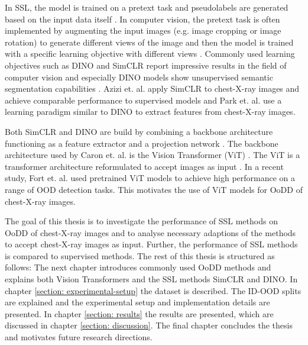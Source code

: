 In SSL, the model is trained on a pretext task and pseudolabels are generated based on the input data itself \citep{Jaiswal2021}.
In computer vision, the pretext task is often implemented by augmenting the input images (e.g. image cropping or image rotation) to generate different views of the image and then the model is trained with a specific learning objective with different views \citep{Jaiswal2020}.
Commonly used learning objectives such as DINO \citep{Caron2021} and SimCLR \citep{Chen2020} report impressive results in the field of computer vision and especially DINO models show unsupervised semantic segmentation capabilities \citep{Caron2021}.
Azizi et. al. \citep{Azizi2021} apply SimCLR to chest-X-ray images and achieve comparable performance to supervised models and Park et. al. \citep{Park2022} use a learning paradigm similar to DINO to extract features from chest-X-ray images.
\par
Both SimCLR and DINO are build by combining a backbone architecture functioning as a feature extractor and a projection network \citep{Caron2021,Chen2020}. 
The backbone architecture used by Caron et. al. is the Vision Transformer (ViT) \citep{Caron2021}.
The ViT is a transformer architecture \citep{Vaswani2017} reformulated to accept images as input \citep{Dosovitskiy2020}.
In a recent study, Fort et. al. \citep{Fort2021} used pretrained ViT models to achieve high performance on a range of OOD detection tasks.
This motivates the use of ViT models for OoDD of chest-X-ray images.
\par
The goal of this thesis is to investigate the performance of SSL methods on OoDD of chest-X-ray images and to analyse necessary adaptions of the methods to accept chest-X-ray images as input.
Further, the performance of SSL methods is compared to supervised methods.
The rest of this thesis is structured as follows: The next chapter introduces commonly used OoDD methods and explains both Vision Transformers and the SSL methods SimCLR and DINO.
In chapter \ref{section: experimental-setup} the dataset is described.
The ID-OOD splits are explained and the experimental setup and implementation details are presented.
In chapter \ref{section: results} the results are presented, which are discussed in chapter \ref{section: discussion}.
The final chapter concludes the thesis and motivates future research directions.
